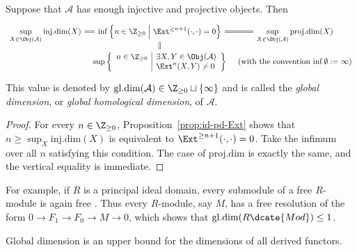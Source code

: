 \begin{definition-proposition}\label{def:global-dim}
	Suppose that $\mathcal{A}$ has enough injective and projective objects. Then
	\[\begin{tikzcd}[row sep=tiny, column sep=tiny, ampersand replacement=\&]
		\displaystyle\sup_{X \in \Obj(\mathcal{A})} \mathrm{inj.dim}(X) \arrow[equal, r] \& \inf \left\{ n \in \Z_{\geq 0} \;\middle| \; \Ext^{\geq n+1}(\cdot, \cdot) = 0 \right\} \arrow[equal, r] \& \displaystyle\sup_{X \in \Obj(\mathcal{A})} \mathrm{proj.dim}(X) \\
		\& \sup\left\{{\begin{array}{r|l}
			 n \in \Z_{\geq 0} & \exists X, Y \in \Obj(\mathcal{A}) \\
			 & \Ext^n(X,Y) \neq 0
		\end{array}}\right\} \arrow[equal, u] \& \text{(with the convention $\inf \emptyset := \infty$)}
	\end{tikzcd}\]
	This value is denoted by
	$\mathrm{gl.dim}(\mathcal{A})\in\Z_{\geq0}\sqcup\{\infty\}$ and is
	called the \emph{global dimension}, or \emph{global homological dimension},
	of $\mathcal{A}$.
\end{definition-proposition}
\begin{proof}
	For every $n\in\Z_{\geq0}$, Proposition~\ref{prop:id-pd-Ext} shows that
	$n\geq\sup_X\mathrm{inj.dim}(X)$ is equivalent to
	$\Ext^{\geq n+1}(\cdot,\cdot)=0$. Take the infimum over all $n$ satisfying
	this condition. The case of $\mathrm{proj.dim}$ is exactly the same, and
	the vertical equality is immediate.
\end{proof}

For example, if $R$ is a principal ideal domain, every submodule of a free
$R$-module is again free \cite[Lemma 6.7.4]{Li1}. Thus every $R$-module,
say $M$, has a free resolution of the form
$0\to F_1\to F_0\to M\to0$, which shows that
$\mathrm{gl.dim}(R\dcate{Mod})\leq1$.

Global dimension is an upper bound for the dimensions of all derived functors.

